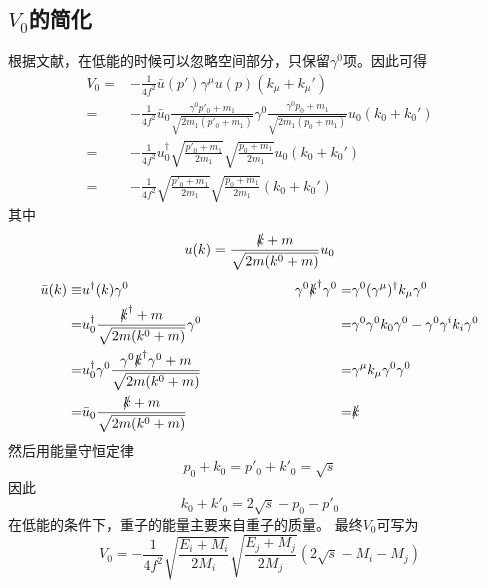 \subsection{$V_{0}$的简化}
根据文献\cite{OSET199899}，在低能的时候可以忽略空间部分，只保留$\gamma^{0}$项。因此可得
\begin{equation}
\begin{split}
	V_{0}=&-\frac{1}{4f^2}\bar{u}(p')\gamma^{\mu}u(p)(k_{\mu}+k_{\mu}')\\
	=&-\frac{1}{4f^2}\bar{u}_{0}\frac{\gamma^{0}p'_{0}+m_{1}}{\sqrt{2m_{1}(p'_{0}+m_{1})}}\gamma^{0}\frac{\gamma^{0}p_{0}+m_{1}}{\sqrt{2m_{1}(p_{0}+m_{1})}}u_{0}(k_{0}+k_{0}')\\
	=&-\frac{1}{4f^2}u^{\dagger}_{0}\sqrt{\frac{p'_{0}+m_{1}}{2m_{1}}}\sqrt{\frac{p_{0}+m_{1}}{2m_{1}}}u_{0}(k_{0}+k_{0}')\\
	=&-\frac{1}{4f^2}\sqrt{\frac{p'_{0}+m_{1}}{2m_{1}}}\sqrt{\frac{p_{0}+m_{1}}{2m_{1}}}(k_{0}+k_{0}')
\end{split}
\end{equation}
其中
\begin{equation*}
	u(k)=\frac{\slashed{k}+m}{\sqrt{2m(k^{0}+m)}}u_{0}
\end{equation*}
\begin{equation*}
\begin{aligned}
	\bar{u}(k)\equiv&u^{\dagger}(k)\gamma^{0}&\hspace{2cm}\gamma^{0}\slashed{k}^{\dagger}\gamma^{0}=&\gamma^{0}(\gamma^{\mu})^{\dagger}k_{\mu}\gamma^{0}\\
	=&u_{0}^{\dagger}\frac{\slashed{k}^{\dagger}+m}{\sqrt{2m(k^{0}+m)}}\gamma^{0}&=&\gamma^{0}\gamma^{0}k_{0}\gamma^{0}-\gamma^{0}\gamma^{i}k_{i}\gamma^{0}\\
	=&u_{0}^{\dagger}\gamma^{0}\frac{\gamma^{0}\slashed{k}^{\dagger}\gamma^{0}+m}{\sqrt{2m(k^{0}+m)}}&=&\gamma^{\mu}k_{\mu}\gamma^{0}\gamma^{0}\\
	=&\bar{u}_{0}\frac{\slashed{k}+m}{\sqrt{2m(k^{0}+m)}}&=&\slashed{k}
\end{aligned}
\end{equation*}
然后用能量守恒定律
\begin{equation}
	p_{0}+k_{0}=p'_{0}+k'_{0}=\sqrt{s}
\end{equation}
因此
\begin{equation}
	k_{0}+k'_{0}=2\sqrt{s}-p_{0}-p'_{0}
\end{equation}
在低能的条件下，重子的能量主要来自重子的质量。
最终$V_{0}$可写为
\begin{equation}
	V_{0}=-\frac{1}{4f^2}\sqrt{\frac{E_{i}+M_{i}}{2M_{i}}}\sqrt{\frac{E_{j}+M_{j}}{2M_{j}}}(2\sqrt{s}-M_{i}-M_{j})
\end{equation}

